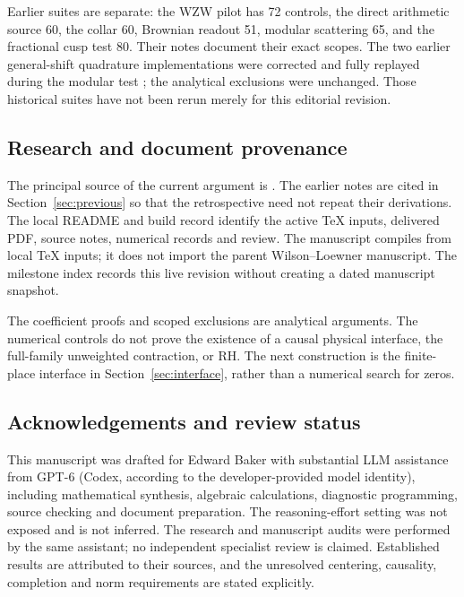 Earlier suites are separate: the WZW pilot has 72 controls, the direct
arithmetic source 60, the collar 60, Brownian readout 51, modular
scattering 65, and the fractional cusp test 80. Their notes document
their exact scopes. The two earlier general-shift quadrature
implementations were corrected and fully replayed during the modular
test \cite[Section~8]{ModularNote}; the analytical exclusions were
unchanged. Those historical suites have not been rerun merely for
this editorial revision.

\subsection{Research and document provenance}

The principal source of the current argument is \cite{OrbitNote}.
The earlier notes are cited in Section~\ref{sec:previous} so that the
retrospective need not repeat their derivations. The local README and
build record identify the active TeX inputs, delivered PDF, source
notes, numerical records and review. The manuscript compiles from
local TeX inputs; it does not import the parent Wilson--Loewner
manuscript. The milestone index records this live revision without
creating a dated manuscript snapshot.

The coefficient proofs and scoped exclusions are analytical arguments.
The numerical controls do not prove the existence of a causal physical
interface, the full-family unweighted contraction, or RH. The next
construction is the finite-place interface in
Section~\ref{sec:interface}, rather than a numerical search for zeros.

\subsection{Acknowledgements and review status}

This manuscript was drafted for Edward Baker with substantial LLM
assistance from GPT-6 (Codex, according to the developer-provided model
identity), including mathematical synthesis, algebraic calculations,
diagnostic programming, source checking and document preparation.
The reasoning-effort setting was not exposed and is not inferred.
The research and manuscript audits were performed by the same
assistant; no independent specialist review is claimed. Established
results are attributed to their sources, and the unresolved centering,
causality, completion and norm requirements are stated explicitly.
